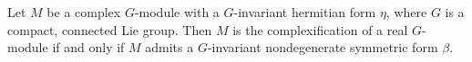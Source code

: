 Let $M$ be a complex $G$-module with a $G$-invariant hermitian form $\eta$, where $G$ is a compact, connected Lie group. Then $M$ is the complexification of a real $G$-module if and only if $M$ admits a $G$-invariant nondegenerate symmetric form $\beta$. %

